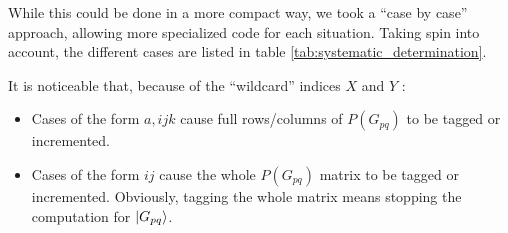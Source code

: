 \documentclass[./thesis.tex]{subfiles}
\begin{document}
While this could be done in a more compact way, we took a ``case by case'' approach, allowing more specialized code for each situation. Taking spin into account, the different cases are listed in table \ref{tab:systematic_determination}.


It is noticeable that, because of the ``wildcard'' indices $X$ and $Y$ :
\begin{itemize}

\item
Cases of the form $a,ijk$ cause full rows/columns of $P(G_{pq})$ to be tagged or incremented.
\item
Cases of the form $ij$ cause the whole $P(G_{pq})$ matrix to be tagged or incremented. Obviously, tagging the whole matrix means stopping the computation for $\ket {G_{pq}}$.
\end{itemize}
\end{document}

